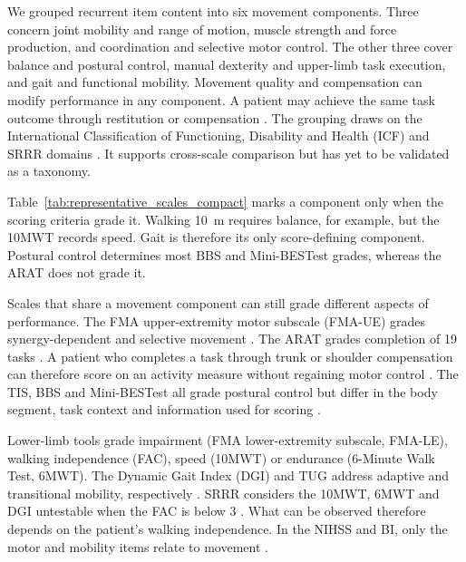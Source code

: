 \documentclass[11pt]{article}
\begin{document}
We grouped recurrent item content into six movement components. Three concern joint mobility and range of motion, muscle strength and force production, and coordination and selective motor control. The other three cover balance and postural control, manual dexterity and upper-limb task execution, and gait and functional mobility. Movement quality and compensation can modify performance in any component. A patient may achieve the same task outcome through restitution or compensation \cite{Levin2009RecoveryCompensation,CoreKwakkel2019SRRRUpperLimb}. The grouping draws on the International Classification of Functioning, Disability and Health (ICF) and SRRR domains \cite{WHO2001ICF,Cieza2019ICFLinking,CoreKwakkel2017SRRRSensorimotor}. It supports cross-scale comparison but has yet to be validated as a taxonomy.

Table~\ref{tab:representative_scales_compact} marks a component only when the scoring criteria grade it. Walking 10~m requires balance, for example, but the 10MWT records speed. Gait is therefore its only score-defining component. Postural control determines most BBS and Mini-BESTest grades, whereas the ARAT does not grade it.

Scales that share a movement component can still grade different aspects of performance. The FMA upper-extremity motor subscale (FMA-UE) grades synergy-dependent and selective movement \cite{ScaleFuglMeyer1975PhysicalPerformance,ScaleSee2013StandardizedFMA}. The ARAT grades completion of 19 tasks \cite{ScaleYozbatiran2008StandardizedARAT}. A patient who completes a task through trunk or shoulder compensation can therefore score on an activity measure without regaining motor control \cite{Levin2009RecoveryCompensation,Santisteban2016UpperLimbOutcome}. The TIS, BBS and Mini-BESTest all grade postural control but differ in the body segment, task context and information used for scoring \cite{ScaleVerheyden2004TIS,ScaleBerg1992BalanceValidation,ScaleFranchignoni2010MiniBESTest}.

Lower-limb tools grade impairment (FMA lower-extremity subscale, FMA-LE), walking independence (FAC), speed (10MWT) or endurance (6-Minute Walk Test, 6MWT). The Dynamic Gait Index (DGI) and TUG address adaptive and transitional mobility, respectively \cite{ScaleHolden1984FAC,ScaleCheng2020StrokeWalkTests,ScaleAn2017DGIStroke,ScaleNg2005TUGStroke}. SRRR considers the 10MWT, 6MWT and DGI untestable when the FAC is below 3 \cite{CoreVanCriekinge2024SRRRBalanceMobility}. What can be observed therefore depends on the patient's walking independence. In the NIHSS and BI, only the motor and mobility items relate to movement \cite{ScaleBrott1989NIHSS,ScaleMahoney1965Barthel}.
\end{document}
